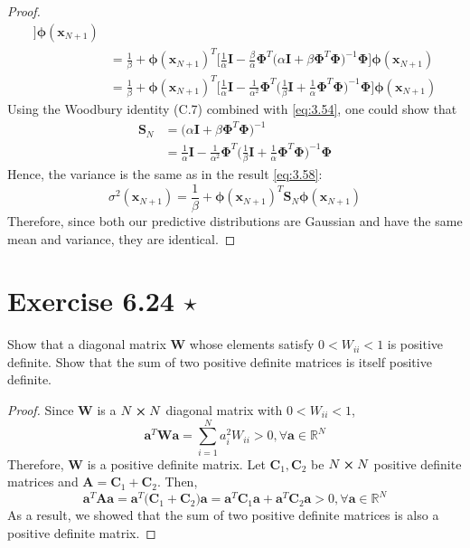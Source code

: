 \begin{proof}
\begin{align*}
        \bigg] \bm{\phi}(\mathbf{x}_{N + 1}) \\
        &= \frac{1}{\beta} + \bm{\phi}(\mathbf{x}_{N + 1})^T \bigg[
            \frac{1}{\alpha} \mathbf{I} - \frac{\beta}{\alpha} \bm{\Phi}^T 
            \big(\alpha \mathbf{I} + \beta \bm{\Phi}^T\bm{\Phi}\big)^{-1} \bm{\Phi}
        \bigg] \bm{\phi}(\mathbf{x}_{N + 1}) \\
        &= \frac{1}{\beta} + \bm{\phi}(\mathbf{x}_{N + 1})^T \bigg[
            \frac{1}{\alpha} \mathbf{I} - \frac{1}{\alpha^2} \bm{\Phi}^T 
            \bigg(\frac{1}{\beta} \mathbf{I} + \frac{1}{\alpha} 
            \bm{\Phi}^T\bm{\Phi}\bigg)^{-1} \bm{\Phi}
        \bigg] \bm{\phi}(\mathbf{x}_{N + 1}) 
    \end{align*}
    Using the Woodbury identity (C.7) combined with \eqref{eq:3.54}, one could show that
    \begin{align*}
       \mathbf{S}_N
       &= \big(\alpha \mathbf{I} + \beta \bm{\Phi}^T \bm{\Phi}\big)^{-1} \\
       &= \frac{1}{\alpha} \mathbf{I} - \frac{1}{\alpha^2} \bm{\Phi}^T
       \bigg(\frac{1}{\beta} \mathbf{I} + \frac{1}{\alpha}\bm{\Phi}^T \bm{\Phi}\bigg)^{-1} 
       \bm{\Phi} 
    \end{align*}
    Hence, the variance is the same as in the result \eqref{eq:3.58}:
    \[
        \sigma^2(\mathbf{x}_{N + 1}) 
        = \frac{1}{\beta} + \bm{\phi}(\mathbf{x}_{N + 1})^T \mathbf{S}_N 
        \bm{\phi}(\mathbf{x}_{N + 1})
    \] 
    Therefore, since both our predictive distributions are Gaussian and
    have the same mean and variance, they are identical.
\end{proof}

\section*{Exercise 6.24 $\star$}
Show that a diagonal matrix $\mathbf{W}$ whose elements satisfy
$0 < W_{ii} < 1$ is positive definite. Show that the sum of two
positive definite matrices is itself positive definite.

\vspace{1em}

\begin{proof}
    Since $\mathbf{W}$ is a $N \cross N$ diagonal matrix with $0 < W_{ii} < 1$,
    \[
        \mathbf{a}^T\mathbf{W}\mathbf{a} = \sum_{i=1}^{N} a_i^2 W_{ii} > 0, 
        \forall \mathbf{a} \in \mathbb{R}^N
    \] 
    Therefore, $\mathbf{W}$ is a positive definite matrix. Let 
    $\mathbf{C}_1, \mathbf{C}_2$ be $N \cross N$ positive definite matrices and 
    $\mathbf{A} = \mathbf{C}_1 + \mathbf{C}_2$.
    Then,
    \[
        \mathbf{a}^T\mathbf{A}\mathbf{a} 
        = \mathbf{a}^T\big(\mathbf{C}_1 + \mathbf{C}_2\big)\mathbf{a}
        = \mathbf{a}^T\mathbf{C}_1\mathbf{a} + \mathbf{a}^T\mathbf{C}_2\mathbf{a} > 0,
        \forall \mathbf{a} \in \mathbb{R}^N
    \] 
    As a result, we showed that the sum of two positive definite matrices is also
    a positive definite matrix.
\end{proof}
